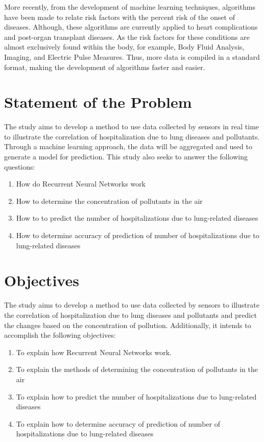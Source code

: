 \documentclass[10pt,11pt,12pt,oneside]{book}
\begin{document}
    More recently, from the development of machine learning techniques, algorithms have been made to relate risk factors with the percent risk of the onset of diseases. Although, these algorithms are currently applied to heart complications and post-organ transplant diseases. As the risk factors for these conditions are almost exclusively found within the body, for example, Body Fluid Analysis, Imaging, and Electric Pulse Measures. Thus, more data is compiled in a standard format, making the development of algorithms faster and easier. 
    \section{Statement of the Problem}
    
    The study aims to develop a method to use data collected by sensors in real time to illustrate the correlation of hospitalization due to lung diseases and pollutants. Through a machine learning approach, the data will be aggregated and used to generate a model for prediction. This study also seeks to answer the following questions:
    \begin{enumerate}
        \item How do Recurrent Neural Networks work
        \item How to determine the concentration of pollutants in the air
        \item How to to predict the number of hospitalizations due to lung-related diseases
        \item How to determine accuracy of prediction of number of hospitalizations due to lung-related diseases
    \end{enumerate}
    \section{Objectives}
    The study aims to develop a method to use data collected by sensors to illustrate the correlation of hospitalization due to lung diseases and pollutants and predict the changes based on the concentration of pollution. Additionally, it intends to accomplish the following objectives:
    \begin{enumerate}
        \item To explain how Recurrent Neural Networks work.
        \item To explain the methods of determining the concentration of pollutants in the air
        \item To explain how to predict the number of hospitalizations due to lung-related diseases
        \item To explain how to determine accuracy of prediction of number of hospitalizations due to lung-related diseases 
    \end{enumerate}
\end{document}
